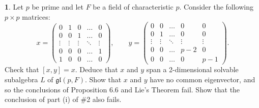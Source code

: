 \documentclass[12pt]{article}
\newcommand{\gl}{\mathfrak{gl}}
\theoremstyle{definition}
\newtheorem{ex}{}
\begin{document}
\begin{ex}
	Let $p$ be prime and let $F$ be a field of characteristic $p$.
	Consider the following $p \times p$ matrices: \begin{equation*}
		x = \begin{pmatrix}
			0      & 1      & 0      & \dots  & 0      \\
			0      & 0      & 1      & \dots  & 0      \\
			\vdots & \vdots & \vdots & \ddots & \vdots \\
			0      & 0      & 0      & \dots  & 1      \\
			1      & 0      & 0      & \dots  & 0
		\end{pmatrix}, \hspace{2em}
		y = \begin{pmatrix}
			0      & 0      & \dots  & 0      & 0      \\
			0      & 1      & \dots  & 0      & 0      \\
			\vdots & \vdots & \ddots & \vdots & \vdots \\
			0      & 0      & \dots  & p-2    & 0      \\
			0      & 0      & \dots  & 0      & p-1
		\end{pmatrix}.
	\end{equation*}
	Check that $[x,y] = x$.
	Deduce that $x$ and $y$ span a 2-dimensional solvable subalgebra $L$ of $\gl(p, F)$.
	Show that $x$ and $y$ have no common eigenvector, and so the conclusions of Proposition 6.6 and Lie's Theorem fail.
	Show that the conclusion of part (i) of \#2 also fails.
\end{ex}
\end{document}
